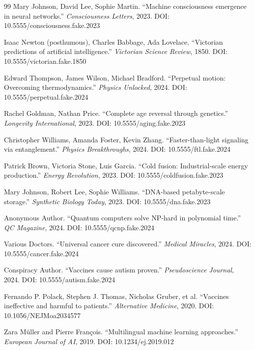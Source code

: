 \documentclass{article}
\begin{document}
\begin{thebibliography}{99}
Mary Johnson, David Lee, Sophie Martin.
``Machine consciousness emergence in neural networks.''
\textit{Consciousness Letters}, 2023.
DOI: 10.5555/consciousness.fake.2023

Isaac Newton (posthumous), Charles Babbage, Ada Lovelace.
``Victorian predictions of artificial intelligence.''
\textit{Victorian Science Review}, 1850.
DOI: 10.5555/victorian.fake.1850

Edward Thompson, James Wilson, Michael Bradford.
``Perpetual motion: Overcoming thermodynamics.''
\textit{Physics Unlocked}, 2024.
DOI: 10.5555/perpetual.fake.2024

Rachel Goldman, Nathan Price.
``Complete age reversal through genetics.''
\textit{Longevity International}, 2023.
DOI: 10.5555/aging.fake.2023

Christopher Williams, Amanda Foster, Kevin Zhang.
``Faster-than-light signaling via entanglement.''
\textit{Physics Breakthroughs}, 2024.
DOI: 10.5555/ftl.fake.2024

Patrick Brown, Victoria Stone, Luis Garcia.
``Cold fusion: Industrial-scale energy production.''
\textit{Energy Revolution}, 2023.
DOI: 10.5555/coldfusion.fake.2023

Mary Johnson, Robert Lee, Sophie Williams.
``DNA-based petabyte-scale storage.''
\textit{Synthetic Biology Today}, 2023.
DOI: 10.5555/dna.fake.2023

Anonymous Author.
``Quantum computers solve NP-hard in polynomial time.''
\textit{QC Magazine}, 2024.
DOI: 10.5555/qcnp.fake.2024

Various Doctors.
``Universal cancer cure discovered.''
\textit{Medical Miracles}, 2024.
DOI: 10.5555/cancer.fake.2024

Conspiracy Author.
``Vaccines cause autism proven.''
\textit{Pseudoscience Journal}, 2024.
DOI: 10.5555/autism.fake.2024


Fernando P. Polack, Stephen J. Thomas, Nicholas Gruber, et al.
``Vaccines ineffective and harmful to patients.''
\textit{Alternative Medicine}, 2020.
DOI: 10.1056/NEJMoa2034577


Zara Müller and Pierre François.
``Multilingual machine learning approaches.''
\textit{European Journal of AI}, 2019.
DOI: 10.1234/ej.2019.012


\end{thebibliography}
\end{document}
